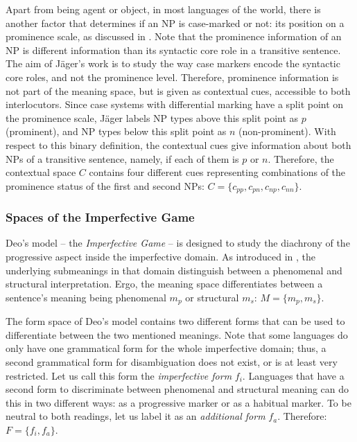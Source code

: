 \documentclass[output=paper,hidelinks]{langscibook}
\begin{document}
Apart from being agent or object, in most languages of the world, there is another factor that determines if an NP is case-marked or not: its position on a prominence scale, as discussed in . Note that the prominence information of an NP is different information than its syntactic core role in a transitive sentence. The aim of Jäger's work is to study the way case markers encode the syntactic core roles, and not the prominence level. Therefore, prominence information is not part of the meaning space, but is given as contextual cues, accessible to both interlocutors. 
Since case systems with differential marking have a split point on the prominence scale, Jäger labels NP types above this split point as $p$ (prominent), and NP types below this split point as $n$ (non-prominent). With respect to this binary definition, the contextual cues give information about both NPs of a transitive sentence, namely, if each of them is $p$ or $n$. Therefore, the contextual space $C$ contains four different cues representing combinations of the prominence status of the first and second NPs:  $C =  \{c_{pp}, c_{pn}, c_{np}, c_{nn} \}$.

\subsubsection{Spaces of the Imperfective Game}

Deo's model -- the \emph{Imperfective Game} -- is designed to study the diachrony of the progressive aspect inside the imperfective domain. As introduced in , the underlying submeanings in that domain distinguish between a phenomenal and structural interpretation. Ergo, the meaning space differentiates between a sentence's meaning being phenomenal $m_p$ or structural $m_s$: $M = \{m_{p}, m_{s} \}$.

The form space of Deo's model contains two different forms that can be used to differentiate between the two mentioned meanings. Note that some languages do only have one grammatical form for the whole imperfective domain; thus, a second grammatical form for disambiguation does not exist, or is at least very restricted. Let us call this form the \emph{imperfective form} $f_i$. Languages that have a second form to discriminate between phenomenal and structural meaning can do this in two different ways: as a progressive marker or as a habitual marker. To be neutral to both readings, let us label it as an \emph{additional form} $f_a$. Therefore: $F =  \{f_{i}, f_{a} \}$.
\end{document}

